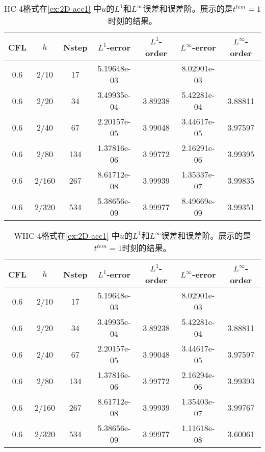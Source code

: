 \def\titleintable{CFL&$h$&Nstep&$L^1$-error&$L^1$-order&$L^\infty$-error&$L^\infty$-order\\}
\begin{table}[htbp]
  \caption{HC-4格式在\cref{ex:2D-acc1} 中$u$的$L^1$和$L^\infty$误差和误差阶。展示的是$t^{tem} = 1$时刻的结果。}
  \label{ta:2D-ex1-HC4}
  \centering
  \begin{tabular}{ccccccc}
    \toprule
    \titleintable
    \midrule
    0.6 & 2/10  & 17  & 5.19648e-03 &         & 8.02901e-03 &         \\
    0.6 & 2/20  & 34  & 3.49935e-04 & 3.89238 & 5.42281e-04 & 3.88811 \\
    0.6 & 2/40  & 67  & 2.20157e-05 & 3.99048 & 3.44617e-05 & 3.97597 \\
    0.6 & 2/80  & 134 & 1.37816e-06 & 3.99772 & 2.16291e-06 & 3.99395 \\
    0.6 & 2/160 & 267 & 8.61712e-08 & 3.99939 & 1.35337e-07 & 3.99835 \\
    0.6 & 2/320 & 534 & 5.38656e-09 & 3.99977 & 8.49669e-09 & 3.99351 \\
    \bottomrule
  \end{tabular}
\end{table}

\begin{table}[htbp]
  \caption{WHC-4格式在\cref{ex:2D-acc1} 中$u$的$L^1$和$L^\infty$误差和误差阶。展示的是$t^{tem} = 1$时刻的结果。}
  \label{ta:2D-ex1-WHC4}
  \centering
  \begin{tabular}{ccccccc}
    \toprule
    \titleintable
    \midrule
    0.6 & 2/10  & 17  & 5.19648e-03 &         & 8.02901e-03 &         \\
    0.6 & 2/20  & 34  & 3.49935e-04 & 3.89238 & 5.42281e-04 & 3.88811 \\
    0.6 & 2/40  & 67  & 2.20157e-05 & 3.99048 & 3.44617e-05 & 3.97597 \\
    0.6 & 2/80  & 134 & 1.37816e-06 & 3.99772 & 2.16294e-06 & 3.99393 \\
    0.6 & 2/160 & 267 & 8.61712e-08 & 3.99939 & 1.35403e-07 & 3.99767 \\
    0.6 & 2/320 & 534 & 5.38656e-09 & 3.99977 & 1.11618e-08 & 3.60061 \\
    \bottomrule
  \end{tabular}
\end{table}

